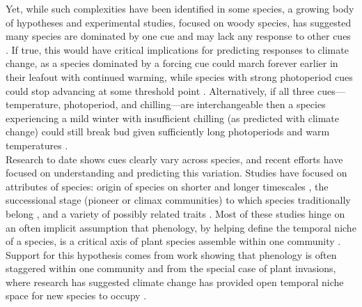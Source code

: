 \documentclass[11pt]{article}
\begin{document}
Yet, while such complexities have been identified in some species, a growing body of hypotheses and experimental studies, focused on woody species, has suggested many species are dominated by one cue and may lack any response to other cues \cite{Korner:2010}. If true, this would have critical implications for predicting responses to climate change, as a species dominated by a forcing cue could march forever earlier in their leafout with continued warming, while species with strong photoperiod cues could stop advancing at some threshold point \cite{Korner:2010}. Alternatively, if all three cues---temperature, photoperiod, and chilling---are interchangeable then a species experiencing a mild winter with insufficient chilling (as predicted with climate change) could still break bud given sufficiently long photoperiods and warm temperatures \cite{Heide:1993b}. \\

Research to date shows cues clearly vary across species, and recent efforts have focused on understanding and predicting this variation. Studies have focused on attributes of species: origin of species on shorter and longer timescales \cite{Willis:2010al,zohner2017}, the successional stage (pioneer or climax communities) to which species traditionally belong \cite{laube2014gcb,Basler:2012aa}, and a variety of possibly related traits \cite{Lechowicz:1984aa,Polgar:2014aa}. Most of these studies hinge on an often implicit assumption that phenology, by helping define the temporal niche of a species, is a critical axis of plant species assemble within one community \cite{gotelli1996}. Support for this hypothesis comes from work showing that phenology is often staggered within one community and from the special case of plant invasions, where research has suggested climate change has provided open temporal niche space for new species to occupy \cite{Willis:2010al,wolkovichAmBot2013}.  \\
\end{document}
